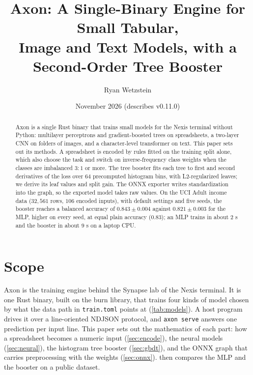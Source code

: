 \documentclass[11pt]{article}
\title{Axon: A Single-Binary Engine for Small Tabular,\\Image and Text Models, with a Second-Order Tree Booster}
\author{Ryan Wetzstein}
\date{November 2026 \quad (describes v0.11.0)}
\theoremstyle{plain}
\theoremstyle{definition}
\newcommand{\code}[1]{\texttt{#1}}
\begin{document}
\maketitle

\begin{abstract}
Axon is a single Rust binary that trains small models for the Nexis terminal
without Python: multilayer perceptrons and gradient-boosted trees on
spreadsheets, a two-layer CNN on folders of images, and a character-level
transformer on text. This paper sets out its methods. A spreadsheet is encoded
by rules fitted on the training split alone, which also choose the task and
switch on inverse-frequency class weights when the classes are imbalanced
$3{:}1$ or more. The tree booster fits each tree to first and second
derivatives of the loss over $64$ precomputed histogram bins, with
L2-regularized leaves; we derive its leaf values and split gain. The ONNX
exporter writes standardization into the graph, so the exported model takes
raw values. On the UCI Adult income data ($32{,}561$ rows, $106$ encoded
inputs), with default settings and five seeds, the booster reaches a balanced
accuracy of $0.843 \pm 0.004$ against $0.821 \pm 0.003$ for the MLP, higher on
every seed, at equal plain accuracy ($0.83$); an MLP trains in about $2$ s and
the booster in about $9$ s on a laptop CPU.
\end{abstract}

\tableofcontents

\section{Scope}\label{sec:scope}

Axon is the training engine behind the Synapse lab of the Nexis terminal. It
is one Rust binary, built on the burn library, that trains four kinds of model
chosen by what the data path in \code{train.toml} points at
(\cref{tab:models}). A host program drives it over a line-oriented NDJSON
protocol, and \code{axon serve} answers one prediction per input line. This
paper sets out the mathematics of each part: how a spreadsheet becomes a
numeric input (\cref{sec:encode}), the neural models (\cref{sec:neural}), the
histogram tree booster (\cref{sec:gbdt}), and the ONNX graph that carries
preprocessing with the weights (\cref{sec:onnx}).  then compares
the MLP and the booster on a public dataset.
\end{document}
